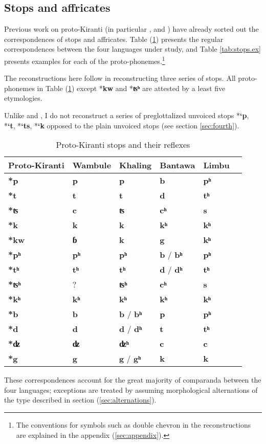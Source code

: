 \documentclass[oldfontcommands,oneside,a4paper,11pt]{article}
\newcommand{\ipa}[1]{\textbf{{\phon\mbox{#1}}}} %
\begin{document}
\subsection{Stops and affricates} \label{sec:stops}

Previous work on proto-Kiranti (in particular \citealt{starostin94kiranti}, \citealt{michailovsky94stops} and \citealt{opgenort05jero}) have already sorted out the correspondences of stops and affricates. Table (\ref{tab:stops}) presents the regular correspondences between the four languages under study, and Table \ref{tab:stops.ex} presents examples for each of the proto-phonemes.\footnote{The conventions for symbols such as double chevron in the reconstructions are explained in the appendix (\ref{sec:appendix}).}


The reconstructions here follow \citet{michailovsky94stops} in reconstructing three series of stops.  All proto-phonemes in Table (\ref{tab:stops}) except *\ipa{kw} and *\ipa{ʦʰ} are attested by a least five etymologies.

Unlike \citet{starostin94kiranti} and \citet{opgenort05jero}, I do not reconstruct a series of preglottalized unvoiced stops *\ipa{`p},  *\ipa{`t},  *\ipa{`ts},  *\ipa{`k} opposed to the plain unvoiced stops (see section \ref{sec:fourth}). 


\begin{table}[h]
\caption{Proto-Kiranti stops and their reflexes} \centering \label{tab:stops}
\begin{tabular}{llllll}
\toprule
Proto-Kiranti & Wambule & Khaling & Bantawa & Limbu \\
\midrule
\ipa{*p} & \ipa{p} & \ipa{p} & \ipa{b} & \ipa{pʰ}  \\
\ipa{*t} & \ipa{t} & \ipa{t} & \ipa{d} & \ipa{tʰ}  \\
\ipa{*ʦ} & \ipa{c} & \ipa{ʦ} & \ipa{cʰ} & \ipa{s}  \\
\ipa{*k} & \ipa{k} & \ipa{k} & \ipa{kʰ} & \ipa{kʰ}  \\
\midrule
\ipa{*kw} & \ipa{ɓ} & \ipa{k} & \ipa{g} & \ipa{kʰ}  \\
\midrule
\ipa{*pʰ} & \ipa{pʰ} & \ipa{pʰ} & \ipa{b} / \ipa{bʰ}  & \ipa{pʰ}  \\
\ipa{*tʰ} & \ipa{tʰ} & \ipa{tʰ} & \ipa{d} / \ipa{dʰ} & \ipa{tʰ}  \\
\ipa{*ʦʰ} & ? & \ipa{ʦʰ} & \ipa{cʰ}  & \ipa{s}  \\
\ipa{*kʰ} & \ipa{kʰ} & \ipa{kʰ} & \ipa{kʰ} & \ipa{kʰ}  \\
\midrule
\ipa{*b} & \ipa{b} &\ipa{b} / \ipa{bʰ}  & \ipa{p} & \ipa{pʰ}  \\
\ipa{*d} & \ipa{d} & \ipa{d} / \ipa{dʰ}  & \ipa{t} & \ipa{tʰ}  \\
\ipa{*ʣ} & \ipa{ʣ} & \ipa{ʣʰ} & \ipa{c} & \ipa{c}  \\
\ipa{*g} & \ipa{g} & \ipa{g} / \ipa{gʰ}  & \ipa{k} & \ipa{k}  \\
\bottomrule
\end{tabular}
\end{table}
These correspondences account for the great majority of comparanda between the four languages; exceptions are treated by assuming  morphological alternations of the type described in section (\ref{sec:alternations}).
\end{document}
